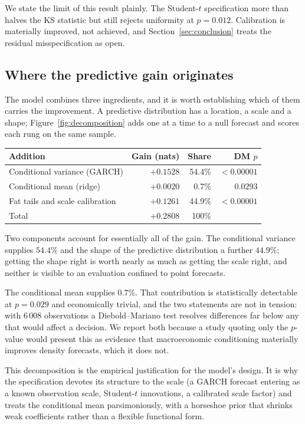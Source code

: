 We state the limit of this result plainly. The Student-$t$ specification more
than halves the KS statistic but still rejects uniformity at $p=0.012$.
Calibration is materially improved, not achieved, and
Section~\ref{sec:conclusion} treats the residual misspecification as open.

\subsection{Where the predictive gain originates}
\label{sec:decomposition}

The model combines three ingredients, and it is worth establishing which of them
carries the improvement. A predictive distribution has a location, a scale and a
shape; Figure~\ref{fig:decomposition} adds one at a time to a null forecast and
scores each rung on the same sample.

\begin{center}
\begin{tabular}{lrrr}
\toprule
Addition & Gain (nats) & Share & DM $p$ \\
\midrule
Conditional variance (GARCH)      & $+0.1528$ & 54.4\% & $<0.00001$ \\
Conditional mean (ridge)          & $+0.0020$ &  0.7\% & $0.0293$ \\
Fat tails and scale calibration   & $+0.1261$ & 44.9\% & $<0.00001$ \\
\midrule
Total                             & $+0.2808$ & 100\%  & \\
\bottomrule
\end{tabular}
\end{center}

Two components account for essentially all of the gain. The conditional variance
supplies $54.4\%$ and the shape of the predictive distribution a further
$44.9\%$; getting the shape right is worth nearly as much as getting the scale
right, and neither is visible to an evaluation confined to point forecasts.

The conditional mean supplies $0.7\%$. That contribution is statistically
detectable at $p=0.029$ and economically trivial, and the two statements are not
in tension: with 6\,008 observations a Diebold--Mariano test resolves
differences far below any that would affect a decision. We report both because a
study quoting only the $p$-value would present this as evidence that
macroeconomic conditioning materially improves density forecasts, which it does
not.

This decomposition is the empirical justification for the model's design. It is
why the specification devotes its structure to the scale (a GARCH forecast
entering as a known observation scale, Student-$t$ innovations, a calibrated
scale factor) and treats the conditional mean parsimoniously, with a horseshoe
prior that shrinks weak coefficients rather than a flexible functional form.

